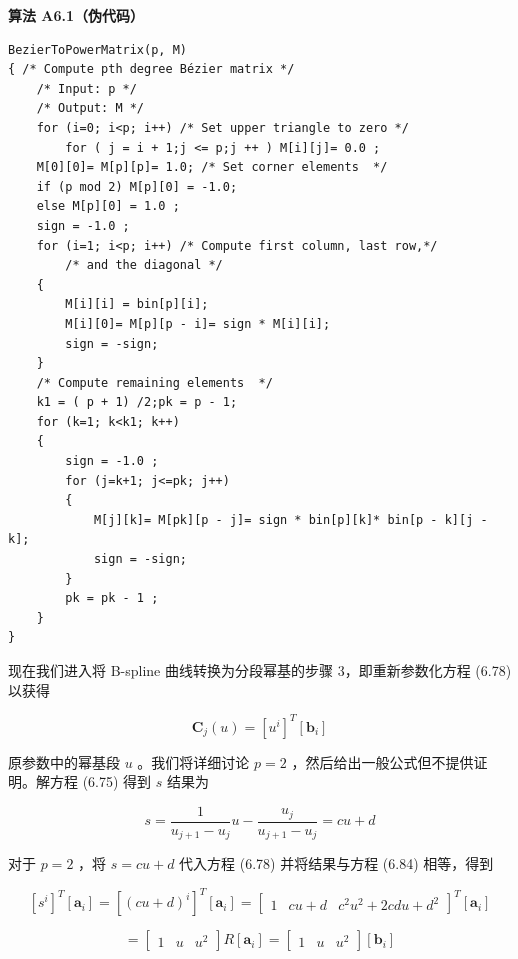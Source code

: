 \documentclass[../main.tex]{subfiles}
\begin{document}
\par\medskip\noindent\textbf{算法 A6.1（伪代码）}\par
\begin{verbatim}
BezierToPowerMatrix(p, M)
{ /* Compute pth degree Bézier matrix */
    /* Input: p */
    /* Output: M */
    for (i=0; i<p; i++) /* Set upper triangle to zero */
        for ( j = i + 1;j <= p;j ++ ) M[i][j]= 0.0 ;
    M[0][0]= M[p][p]= 1.0; /* Set corner elements  */
    if (p mod 2) M[p][0] = -1.0;
    else M[p][0] = 1.0 ;
    sign = -1.0 ;
    for (i=1; i<p; i++) /* Compute first column, last row,*/
        /* and the diagonal */
    {
        M[i][i] = bin[p][i];
        M[i][0]= M[p][p - i]= sign * M[i][i];
        sign = -sign;
    }
    /* Compute remaining elements  */
    k1 = ( p + 1) /2;pk = p - 1;
    for (k=1; k<k1; k++)
    {
        sign = -1.0 ;
        for (j=k+1; j<=pk; j++)
        {
            M[j][k]= M[pk][p - j]= sign * bin[p][k]* bin[p - k][j - k];
            sign = -sign;
        }
        pk = pk - 1 ;
    }
}
\end{verbatim}

现在我们进入将 B-spline 曲线转换为分段幂基的步骤 3，即重新参数化方程 (6.78) 以获得

\[
{\mathbf{C}}_{j}\left( u\right)  = {\left\lbrack  {u}^{i}\right\rbrack  }^{T}\left\lbrack  {\mathbf{b}}_{i}\right\rbrack   \tag{6.84}
\]

原参数中的幂基段 \(u\) 。我们将详细讨论 \(p = 2\) ，然后给出一般公式但不提供证明。解方程 (6.75) 得到 \(s\) 结果为

\[
s = \frac{1}{{u}_{j + 1} - {u}_{j}}u - \frac{{u}_{j}}{{u}_{j + 1} - {u}_{j}} = {cu} + d \tag{6.85}
\]

对于 \(p = 2\) ，将 \(s = {cu} + d\) 代入方程 (6.78) 并将结果与方程 (6.84) 相等，得到

\[
{\left\lbrack  {s}^{i}\right\rbrack  }^{T}\left\lbrack  {\mathbf{a}}_{i}\right\rbrack   = {\left\lbrack  {\left( cu + d\right) }^{i}\right\rbrack  }^{T}\left\lbrack  {\mathbf{a}}_{i}\right\rbrack   = {\left\lbrack  \begin{array}{lll} 1 & {cu} + d & {c}^{2}{u}^{2} + {2cdu} + {d}^{2} \end{array}\right\rbrack  }^{T}\left\lbrack  {\mathbf{a}}_{i}\right\rbrack
\]

\[
= \left\lbrack  \begin{array}{lll} 1 & u & {u}^{2} \end{array}\right\rbrack  R\left\lbrack  {\mathbf{a}}_{i}\right\rbrack   = \left\lbrack  \begin{array}{lll} 1 & u & {u}^{2} \end{array}\right\rbrack  \left\lbrack  {\mathbf{b}}_{i}\right\rbrack   \tag{6.86}
\]
\end{document}
